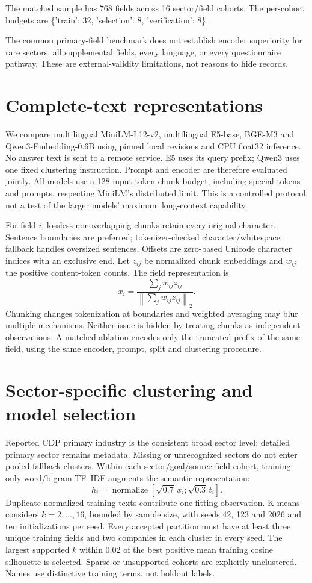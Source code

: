 \documentclass[12pt]{article}
\begin{document}
The matched sample has 768 fields across 16 sector/field cohorts. The per-cohort budgets are \{'train': 32, 'selection': 8, 'verification': 8\}.

The common primary-field benchmark does not establish encoder superiority for
rare sectors, all supplemental fields, every language, or every questionnaire
pathway. These are external-validity limitations, not reasons to hide records.

\section{Complete-text representations}
We compare multilingual MiniLM-L12-v2, multilingual E5-base, BGE-M3 and
Qwen3-Embedding-0.6B using pinned local revisions and CPU float32 inference.
No answer text is sent to a remote service. E5 uses its query prefix; Qwen3 uses
one fixed clustering instruction. Prompt and encoder are therefore evaluated
jointly. All models use a 128-input-token chunk budget, including special tokens
and prompts, respecting MiniLM's distributed limit. This is a controlled
protocol, not a test of the larger models' maximum long-context capability.

For field $i$, lossless nonoverlapping chunks retain every original character.
Sentence boundaries are preferred; tokenizer-checked character/whitespace
fallback handles oversized sentences. Offsets are zero-based Unicode character
indices with an exclusive end. Let $z_{ij}$ be normalized chunk embeddings and
$w_{ij}$ the positive content-token counts. The field representation is
\[
 x_i=\frac{\sum_j w_{ij}z_{ij}}{\left\|\sum_j w_{ij}z_{ij}\right\|_2}.
\]
Chunking changes tokenization at boundaries and weighted averaging may blur
multiple mechanisms. Neither issue is hidden by treating chunks as independent
observations. A matched ablation encodes only the truncated prefix of the same
field, using the same encoder, prompt, split and clustering procedure.

\section{Sector-specific clustering and model selection}
Reported CDP primary industry is the consistent broad sector level; detailed
primary sector remains metadata. Missing or unrecognized sectors do not enter
pooled fallback clusters. Within each sector/goal/source-field cohort, training-only
word/bigram TF--IDF augments the semantic representation:
\[
 h_i=\operatorname{normalize}
 [\sqrt{0.7}\,x_i;\sqrt{0.3}\,t_i].
\]
Duplicate normalized training texts contribute one fitting observation.
K-means considers $k=2,\ldots,16$, bounded by sample size, with seeds 42, 123
and 2026 and ten initializations per seed. Every accepted partition must have
at least three unique training fields and two companies in each cluster in every
seed. The largest supported $k$ within 0.02 of the best positive mean training
cosine silhouette is selected. Sparse or unsupported cohorts are explicitly
unclustered. Names use distinctive training terms, not holdout labels.
\end{document}
